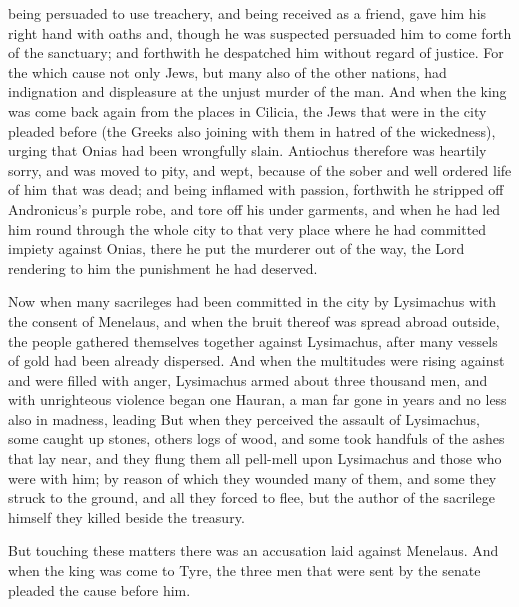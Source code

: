 {{} being persuaded to use treachery, and being received as a friend,
{} gave him his right hand with oaths
{} and, though he was suspected
{} persuaded him to come forth of the sanctuary; and forthwith he
 despatched him without regard of justice.
For the which cause not only Jews, but many also of the other nations, had indignation and displeasure at the unjust murder of the man.
And when the king was come back again from the places in Cilicia, the Jews that were
 in the city pleaded before
{} (the Greeks also joining with them in hatred of the wickedness), urging that Onias had been wrongfully slain.
Antiochus therefore was heartily sorry, and was moved to pity, and wept, because of the sober and well ordered life of him that was dead;
and being inflamed with passion, forthwith he stripped off Andronicus’s purple robe, and
 tore off his under garments, and when he had led him round through the whole city to that very place where he had committed impiety against Onias, there he put the murderer out of the way, the Lord rendering to him the punishment he had deserved.
\par }{\PP {}Now when many sacrileges had been committed in the city by Lysimachus with the consent of Menelaus, and when the bruit thereof was spread abroad outside, the people gathered themselves together against Lysimachus, after many vessels of gold had been already dispersed.
And when the multitudes were rising against
{} and were filled with anger, Lysimachus armed about three thousand men, and with unrighteous violence began
{} one Hauran, a man far gone in years and no less also in madness, leading
{}
But when they perceived the assault of Lysimachus, some caught up stones, others logs of wood, and some took handfuls of the ashes that lay near, and they flung them all pell-mell upon Lysimachus and those who were with him;
by reason of which they wounded many of them, and some they struck to the ground, and all
{} they forced to flee, but the author of the sacrilege himself they killed beside the treasury.
\par }{\PP {}But touching these matters there was an accusation laid against Menelaus.
And when the king was come to Tyre, the three men that were sent by the senate pleaded the cause before him.
}
